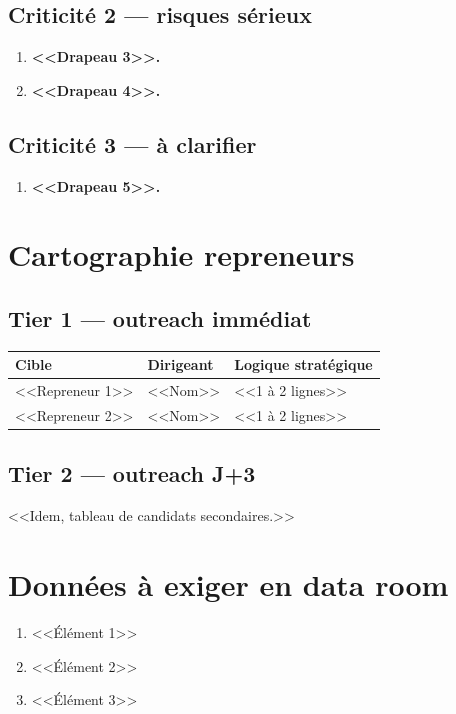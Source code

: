 \documentclass[11pt,a4paper]{article}
\begin{document}
\subsection{Criticité 2 --- risques sérieux}

\begin{enumerate}[leftmargin=2em,start=3]
  \item \textbf{<<Drapeau 3>>.}
  \item \textbf{<<Drapeau 4>>.}
\end{enumerate}

\subsection{Criticité 3 --- à clarifier}

\begin{enumerate}[leftmargin=2em,start=5]
  \item \textbf{<<Drapeau 5>>.}
\end{enumerate}

\section{Cartographie repreneurs}

\subsection{Tier 1 --- outreach immédiat}

\begin{tabular}{p{4cm}p{3cm}p{6cm}}
\toprule
Cible & Dirigeant & Logique stratégique \\
\midrule
<<Repreneur 1>> & <<Nom>> & <<1 à 2 lignes>> \\
<<Repreneur 2>> & <<Nom>> & <<1 à 2 lignes>> \\
\bottomrule
\end{tabular}

\subsection{Tier 2 --- outreach J+3}

<<Idem, tableau de candidats secondaires.>>

\section{Données à exiger en data room}

\begin{enumerate}[leftmargin=2em]
  \item <<Élément 1>>
  \item <<Élément 2>>
  \item <<Élément 3>>
\end{enumerate}
\end{document}
